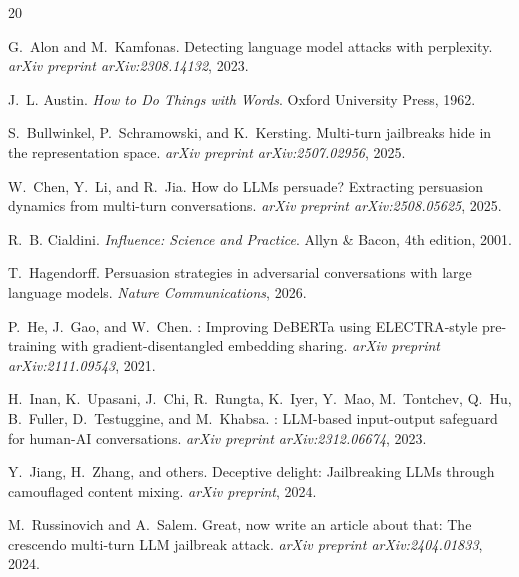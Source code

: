 \documentclass[11pt,a4paper]{article}
\begin{document}
\begin{thebibliography}{20}

G.~Alon and M.~Kamfonas.
\newblock Detecting language model attacks with perplexity.
\newblock \emph{arXiv preprint arXiv:2308.14132}, 2023.

J.~L. Austin.
\newblock \emph{How to Do Things with Words}.
\newblock Oxford University Press, 1962.

S.~Bullwinkel, P.~Schramowski, and K.~Kersting.
\newblock Multi-turn jailbreaks hide in the representation space.
\newblock \emph{arXiv preprint arXiv:2507.02956}, 2025.

W.~Chen, Y.~Li, and R.~Jia.
\newblock How do {LLMs} persuade? {E}xtracting persuasion dynamics from multi-turn conversations.
\newblock \emph{arXiv preprint arXiv:2508.05625}, 2025.

R.~B. Cialdini.
\newblock \emph{Influence: Science and Practice}.
\newblock Allyn \& Bacon, 4th edition, 2001.

T.~Hagendorff.
\newblock Persuasion strategies in adversarial conversations with large language models.
\newblock \emph{Nature Communications}, 2026.

P.~He, J.~Gao, and W.~Chen.
: Improving {DeBERTa} using {ELECTRA}-style pre-training with gradient-disentangled embedding sharing.
\newblock \emph{arXiv preprint arXiv:2111.09543}, 2021.

H.~Inan, K.~Upasani, J.~Chi, R.~Rungta, K.~Iyer, Y.~Mao, M.~Tontchev, Q.~Hu, B.~Fuller, D.~Testuggine, and M.~Khabsa.
: {LLM}-based input-output safeguard for human-{AI} conversations.
\newblock \emph{arXiv preprint arXiv:2312.06674}, 2023.

Y.~Jiang, H.~Zhang, and others.
\newblock Deceptive delight: Jailbreaking {LLMs} through camouflaged content mixing.
\newblock \emph{arXiv preprint}, 2024.

M.~Russinovich and A.~Salem.
\newblock Great, now write an article about that: The crescendo multi-turn {LLM} jailbreak attack.
\newblock \emph{arXiv preprint arXiv:2404.01833}, 2024.


\end{thebibliography}
\end{document}
